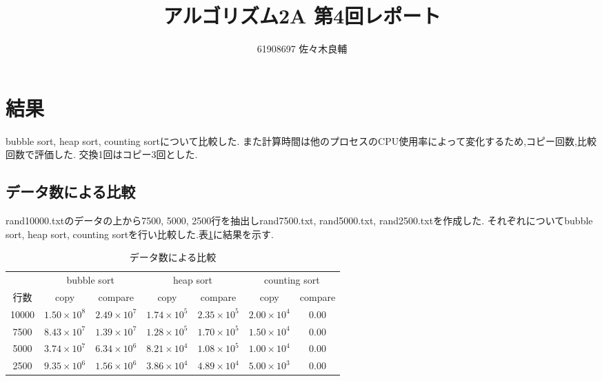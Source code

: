 \documentclass[uplatex,a4j,11pt,dvipdfmx]{jsarticle}
\begin{document}
\title{アルゴリズム2A 第4回レポート}
\author{61908697 佐々木良輔}
\date{}
\maketitle
\section{結果}
bubble sort, heap sort, counting sortについて比較した.
また計算時間は他のプロセスのCPU使用率によって変化するため,コピー回数,比較回数で評価した.
交換1回はコピー3回とした.
\subsection{データ数による比較}
rand10000.txtのデータの上から7500, 5000, 2500行を抽出しrand7500.txt, rand5000.txt, rand2500.txtを作成した.
それぞれについてbubble sort, heap sort, counting sortを行い比較した.表\ref{tab:2}に結果を示す.
\begin{table}[h]
  \caption{データ数による比較}
  \label{tab:2}
  \centering
  \begin{tabular}{c|cc|cc|cc}
  \hline
  &\multicolumn{2}{c|}{bubble sort}&\multicolumn{2}{c|}{heap sort}&\multicolumn{2}{c}{counting sort}\\
  行数&copy&compare&copy&compare&copy&compare\\
  \hline \hline
  10000 & $1.50\times10^{8}$ & $2.49\times10^{7}$ & $1.74\times10^{5}$ & $2.35\times10^{5}$ & $2.00\times10^{4}$ & $0.00$\\
  7500  & $8.43\times10^{7}$ & $1.39\times10^{7}$ & $1.28\times10^{5}$ & $1.70\times10^{5}$ & $1.50\times10^{4}$ & $0.00$\\
  5000  & $3.74\times10^{7}$ & $6.34\times10^{6}$ & $8.21\times10^{4}$ & $1.08\times10^{5}$ & $1.00\times10^{4}$ & $0.00$\\
  2500  & $9.35\times10^{6}$ & $1.56\times10^{6}$ & $3.86\times10^{4}$ & $4.89\times10^{4}$ & $5.00\times10^{3}$ & $0.00$\\
  \hline
  \end{tabular}
  \end{table}
\end{document}

